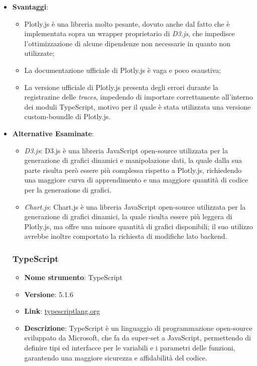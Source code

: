 \begin{itemize}
\item \textbf{Svantaggi}:
\begin{itemize}
      \item Plotly.js è una libreria molto pesante, dovuto anche dal fatto che è implementata sopra un wrapper proprietario di \textit{D3.js},
            che impedisce l'ottimizzazione di alcune dipendenze non necessarie in quanto non utilizzate;
      \item La documentazione ufficiale di Plotly.js è vaga e poco esaustiva;
      \item La versione ufficiale di Plotly.js presenta degli errori durante la registrazine delle \textit{traces}, impedendo di importare correttamente
             all'interno dei moduli TypeScript, motivo per il quale è stata utilizzata una versione custom-boundle di Plotly.js.
\end{itemize}
\item \textbf{Alternative Esaminate}:
\begin{itemize}
      \item \textit{D3.js}: D3.js è una libreria JavaScript open-source utilizzata per la generazione di grafici dinamici e manipolazione dati, la quale dalla sua parte risulta però
            essere più complessa rispetto a Plotly.js, richiedendo una maggiore curva di apprendimento e una maggiore quantità di codice per la generazione di grafici.
      \item \textit{Chart.js}: Chart.js è una libreria JavaScript open-source utilizzata per la generazione di grafici dinamici, la quale risulta essere più leggera di Plotly.js,
            ma offre una minore quantità di grafici disponibili; il suo utilizzo avrebbe inoltre comportato la richiesta di modifiche lato backend.
\end{itemize}

\subsubsection{TypeScript}
\begin{itemize}
      \item \textbf{Nome strumento}: TypeScript
      \item \textbf{Versione}: 5.1.6
      \item \textbf{Link}: \href{https://www.typescriptlang.org/}{typescriptlang.org}
      \item \textbf{Descrizione}: TypeScript è un linguaggio di programmazione open-source sviluppato da Microsoft, che fa da super-set a JavaScript,
            permettendo di definire tipi ed interfacce per le variabili e i parametri delle funzioni, garantendo una maggiore sicurezza e affidabilità del codice.
\end{itemize}


\end{itemize}
